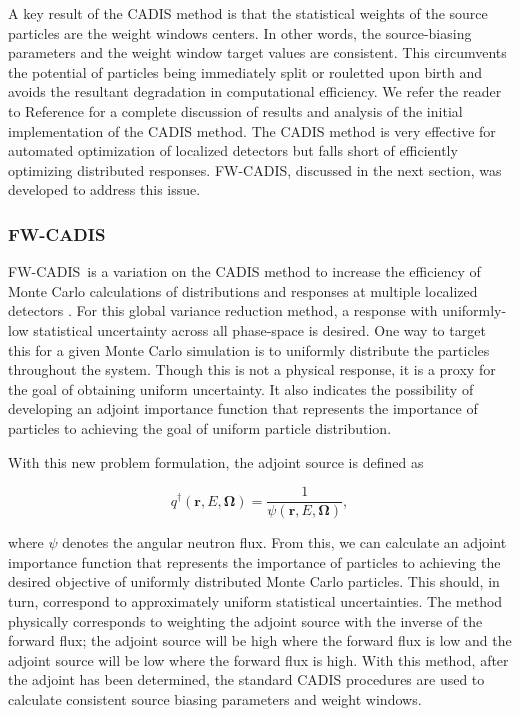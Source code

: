 \documentclass{article} %
\newcommand{\bo}{\mathbf\Omega}
\newcommand{\vecr}{\textbf{r}}
\newcommand{\fwc}{\mbox{FW-CADIS}}
\begin{document}
A key result of the CADIS method is that the statistical weights of
the source particles are the weight windows centers. In other
words, the source-biasing parameters and the weight window target values are
consistent. This circumvents the potential of particles being immediately split
or rouletted upon birth and avoids the resultant degradation in computational
efficiency. We refer the reader to Reference \cite{cadis} for a complete
discussion of results and analysis of the initial implementation of the CADIS
method. The CADIS method is very effective for automated optimization of
localized detectors but falls short of efficiently optimizing distributed
responses. \fwc, discussed in the next section, was developed to address this
issue.

\subsubsection{\fwc}

\fwc\ is a variation on the CADIS method to increase the efficiency of Monte
Carlo calculations of distributions and responses at multiple localized
detectors \cite{fwcadis}. For this global variance reduction method, a
response with uniformly-low statistical uncertainty across all phase-space is
desired. One way to target this for a given Monte Carlo simulation is to
uniformly distribute the particles throughout the system. Though this is not a
physical response, it is a proxy for the goal of obtaining uniform
uncertainty. It also indicates the possibility of developing an adjoint
importance function that represents the importance of particles to achieving
the goal of uniform particle distribution.

With this new problem formulation, the adjoint source is defined as

\begin{equation}
q^{\dagger}(\vecr,E,\bo) = \frac{1}{\psi(\vecr,E,\bo)},
\end{equation}

\noindent where $\psi$ denotes the angular neutron flux. From this,
we can calculate an adjoint importance function that represents the
importance of particles to achieving the desired objective of uniformly
distributed Monte Carlo particles. This should, in turn, correspond to
approximately uniform statistical uncertainties. The method physically 
corresponds to weighting the adjoint source with the inverse of the forward
flux; the adjoint source will be high where the forward flux is low and the
adjoint source will be low where the forward flux is high. With this method,
after the adjoint has been determined, the standard CADIS procedures are used
to calculate consistent source biasing parameters and weight windows.
\end{document}
